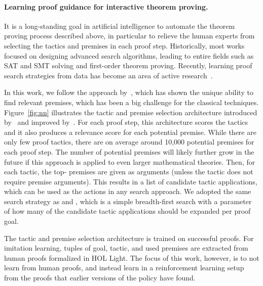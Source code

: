 \documentclass{article}
\begin{document}
\paragraph{Learning proof guidance for interactive theorem proving.}


It is a long-standing goal in artificial intelligence to automate the theorem proving process described above, in particular to relieve the human experts from selecting the tactics and premises in each proof step.
Historically, most works focused on designing advanced search algorithms, leading to entire fields such as SAT and SMT solving and first-order theorem proving.
Recently, learning proof search strategies from data has become an area of active research~\citep{alemi2016deepmath, gauthier2017tactictoe,loos2017deep,kaliszyk2018reinforcement,huang2018gamepad,bansal2019holist,lederman2020learningQBF}.

In this work, we follow the approach by~\cite{bansal2019holist}, which has shown the unique ability to find relevant premises, which has been a big challenge for the classical techniques. Figure~\ref{fig:nn} illustrates the tactic and premise selection architecture introduced by~\cite{bansal2019holist} and improved by~\cite{paliwal2020graph}.
For each proof step, this architecture scores the tactics and it also produces a relevance score for each potential premise.
While there are only few proof tactics, there are on average around 10,000 potential premises for each proof step.
The number of potential premises will likely further grow in the future if this approach is applied to even larger mathematical theories.
Then, for each tactic, the top- premises are given as arguments (unless the tactic does not require premise arguments).
This results in a list of candidate tactic applications, which can be used as the actions in any search approach.
We adopted the same search strategy as \cite{bansal2019holist} and \cite{paliwal2020graph}, which is a simple breadth-first search with a parameter of how many of the candidate tactic applications should be expanded per proof goal.

The tactic and premise selection architecture is trained on successful proofs.
For imitation learning, tuples of goal, tactic, and used premises are extracted from human proofs formalized in HOL Light.
The focus of this work, however, is to not learn from human proofs, and instead learn in a reinforcement learning setup from the proofs that earlier versions of the policy have found.
\end{document}
